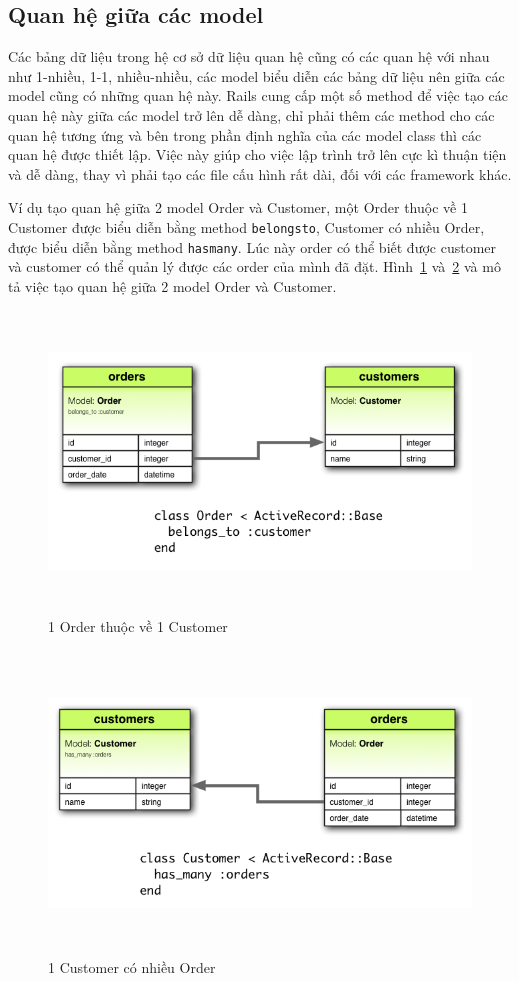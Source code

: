 \subsection{Quan hệ giữa các model}
Các bảng dữ liệu trong hệ cơ sở dữ liệu quan hệ cũng có các quan hệ với nhau như 1-nhiều, 1-1, nhiều-nhiều, các model biểu diễn các bảng dữ liệu nên giữa các model cũng có những quan hệ này.
Rails cung cấp một số method để việc tạo các quan hệ này giữa các model trở lên dễ dàng, chỉ phải thêm các method cho các quan hệ tương ứng và bên trong phần định nghĩa của các model class thì các quan hệ được thiết lập. Việc này giúp cho việc lập trình trở lên cực kì thuận tiện và dễ dàng, thay vì phải tạo các file cấu hình rất dài, đối với các framework khác.
 

Ví dụ tạo quan hệ giữa 2 model Order và Customer, một Order thuộc về 1 Customer được biểu diễn bằng method \texttt{belongs\textunderscore to}, Customer có nhiều Order, được biểu diễn bằng method \texttt{has\textunderscore many}. Lúc này order có thể biết được customer và customer có thể quản lý được các order của mình đã đặt.
Hình~\ref{fig:belongs_to} và~\ref{fig:has_many} và mô tả việc tạo quan hệ giữa 2 model Order và Customer.
\begin{figure}
	\centering
		\includegraphics[width=14cm, height=8cm]{image/belongs_to.png}
	\caption{1 Order thuộc về 1 Customer}
	\label{fig:belongs_to}
\end{figure}
\begin{figure}
	\centering
		\includegraphics[width=14cm, height=8cm]{image/has_many.png}
	\caption{1 Customer có nhiều Order}
	\label{fig:has_many}
\end{figure}


